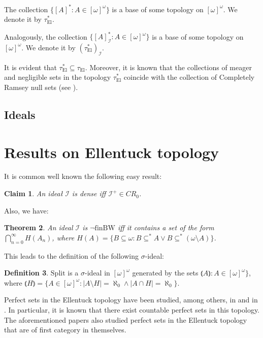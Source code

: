 \documentclass[12pt]{amsart}
\theoremstyle{plain}
\newtheorem{theorem}{Theorem}[section]
\newtheorem{claim}[theorem]{Claim}
\theoremstyle{definition}
\newtheorem{definition}[theorem]{Definition}
\theoremstyle{remark}
\newcommand{\infsub}{[\omega]^{\omega}}
\newcommand{\calI}{\mathcal{I}}
\newcommand{\EllentuckTopology}{\tau_\mathrm{El}}
\newcommand{\EllentuckTopologyStar}{\EllentuckTopology^*}
\newcommand{\EllentuckTopologyStarIdeal}{(\EllentuckTopologyStar)_{\calI}}
\newcommand{\lNawiasik}{\lParen}
\newcommand{\rNawiasik}{\rParen}
\newcommand{\notfinBW}{\neg \mathrm{finBW}}
\begin{document}
The collection $\lbrace [A]^*\colon A \in \infsub\rbrace$
is a base of some topology on $\infsub$. We denote
it by $\EllentuckTopologyStar$.

Analogously, the collection $\lbrace [A]^*_{\calI} \colon A \in \infsub\rbrace$
is a base of some topology on $\infsub$. We denote
it by $\EllentuckTopologyStarIdeal$.

It is evident that $\EllentuckTopologyStar \subseteq \EllentuckTopology$.
Moreover, it is known that the collections of meager and negligible
sets in the topology $\EllentuckTopologyStar$
coincide with the collection of Completely Ramsey null sets
(see \cite{Plewik1987}).

\subsection{Ideals}

\section{Results on Ellentuck topology}

It is common well known the following easy result:
\begin{claim}
An ideał $\calI$ is dense iff $\calI^+ \in CR_0$.
\end{claim}

Also, we have: 
\begin{theorem}
  An ideal $\calI$ is $\notfinBW$ iff it contains a set of the form
  \linebreak
$\bigcap_{n=0}^\infty H(A_n)$, where
 $H(A) = \lbrace B \subseteq \omega \colon B \subseteq^* A \vee B \subseteq^* (\omega\setminus A)\rbrace$.
\end{theorem}

This leads to the definition of the following $\sigma$-ideal:

\begin{definition}
$\mathrm{Split}$ is a $\sigma$-ideal in
$\infsub$ generated by the sets
  \linebreak $\lNawiasik A \rNawiasik \colon A \in \infsub \rbrace$,
where  
$\lNawiasik H \rNawiasik = 
\lbrace A \in \infsub \colon |A \setminus H| = \aleph_0 \wedge |A \cap H| = \aleph_0\rbrace$.
\end{definition}

Perfect sets in the Ellentuck topology have been studied,
among others, in \cite{Reardon1996} and in \cite{NowikReardon2003}.
In particular, it is known that there exist countable perfect sets in this topology.
The aforementioned papers also studied perfect sets in the Ellentuck topology
that are of first category in themselves.
\end{document}
